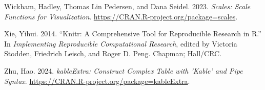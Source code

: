 \documentclass[
  letterpaper,
  DIV=11,
  numbers=noendperiod]{scrartcl}
\newlength{\cslhangindent}
\newenvironment{CSLReferences}[2] %
 {\begin{list}{}{%
  \setlength{\itemindent}{0pt}
  \setlength{\leftmargin}{0pt}
  \setlength{\parsep}{0pt}
  \ifodd #1
   \setlength{\leftmargin}{\cslhangindent}
   \setlength{\itemindent}{-1\cslhangindent}
  \fi
  \setlength{\itemsep}{#2\baselineskip}}}
 {\end{list}}
\begin{document}
\begin{CSLReferences}{1}{0}
Wickham, Hadley, Thomas Lin Pedersen, and Dana Seidel. 2023.
\emph{Scales: Scale Functions for Visualization}.
\url{https://CRAN.R-project.org/package=scales}.

Xie, Yihui. 2014. {``Knitr: A Comprehensive Tool for Reproducible
Research in {R}.''} In \emph{Implementing Reproducible Computational
Research}, edited by Victoria Stodden, Friedrich Leisch, and Roger D.
Peng. Chapman; Hall/CRC.

Zhu, Hao. 2024. \emph{kableExtra: Construct Complex Table with 'Kable'
and Pipe Syntax}. \url{https://CRAN.R-project.org/package=kableExtra}.

\end{CSLReferences}
\end{document}
